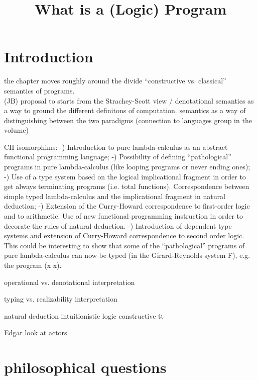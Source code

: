 \documentclass[]{article}
\title{What is a (Logic) Program}
\author{}
\begin{document}
\maketitle

\begin{abstract}

\end{abstract}

\section{Introduction}

the chapter moves roughly around the divide ``constructive vs. classical'' semantics of programs.\\


(JB) proposal to starts from the Strachey-Scott view / denotational semantics as a way to ground the different definitons of computation. semantics as a way of distinguishing between the two paradigms (connection to languages group in the volume)


CH isomorphims:
-) Introduction to pure lambda-calculus as an abstract functional programming language;
-) Possibility of defining “pathological” programs in pure lambda-calculus (like looping programs or never ending ones);
-) Use of a type system based on the logical implicational fragment in order to get always terminating programs (i.e. total functions). Correspondence between simple typed lambda-calculus and the implicational fragment in natural deduction;
-) Extension of the Curry-Howard correspondence to first-order logic and to arithmetic. Use of new functional programming instruction in order to decorate the rules of natural deduction. 
-) Introduction of dependent type systems and extension of Curry-Howard correspondence to second order logic. This could be interesting to show that some of the “pathological” programs of pure lambda-calculus can now be typed (in the Girard-Reynolds system F), e.g. the program (x x).




operational vs. denotational interpretation

typing vs. realizability interpretation

natural deduction
intuitionistic logic
constructive tt


Edgar look at actors

\section{philosophical questions}
\end{document}
